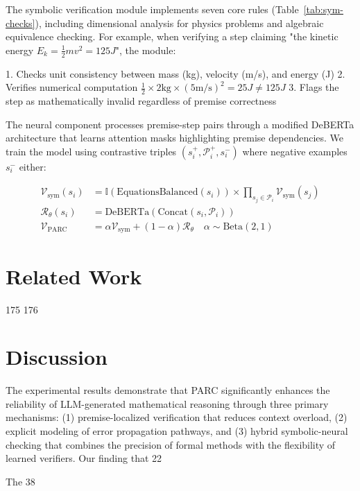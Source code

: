 \documentclass{article}
\begin{document}
The symbolic verification module implements seven core rules (Table~\ref{tab:sym-checks}), including dimensional analysis for physics problems and algebraic equivalence checking. For example, when verifying a step claiming "the kinetic energy $E_k = \frac{1}{2}mv^2 = 125J$", the module:

1. Checks unit consistency between mass (kg), velocity (m/s), and energy (J)
2. Verifies numerical computation $\frac{1}{2} \times 2\text{kg} \times (5\text{m/s})^2 = 25J \neq 125J$
3. Flags the step as mathematically invalid regardless of premise correctness

The neural component processes premise-step pairs through a modified DeBERTa architecture that learns attention masks highlighting premise dependencies. We train the model using contrastive triples $(s_i^+, \mathcal{P}_i^+, s_i^-)$ where negative examples $s_i^-$ either:

\begin{align}
\mathcal{V}_{\text{sym}}(s_i) &= \mathbb{I}(\text{EquationsBalanced}(s_i)) \times \prod_{s_j \in \mathcal{P}_i} \mathcal{V}_{\text{sym}}(s_j) \\
\mathcal{R}_\theta(s_i) &= \text{DeBERTa}(\text{Concat}(s_i, \mathcal{P}_i)) \\
\mathcal{V}_{\text{PARC}} &= \alpha \mathcal{V}_{\text{sym}} + (1-\alpha)\mathcal{R}_\theta \quad \alpha \sim \text{Beta}(2,1)
\end{align}
\section*{Related Work}

 175 176
\section*{Discussion}
The experimental results demonstrate that PARC significantly enhances the reliability of LLM-generated mathematical reasoning through three primary mechanisms: (1) premise-localized verification that reduces context overload, (2) explicit modeling of error propagation pathways, and (3) hybrid symbolic-neural checking that combines the precision of formal methods with the flexibility of learned verifiers. Our finding that 22%

The 38%
\end{document}

